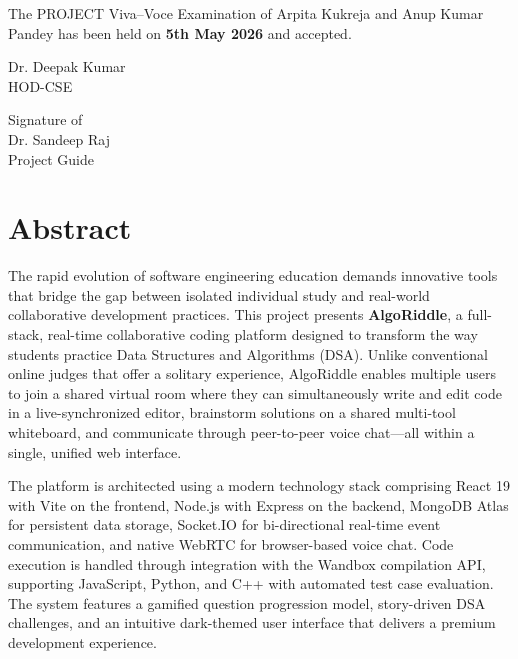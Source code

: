 \documentclass[12pt,a4paper,oneside]{report}
\begin{document}
\vspace{2cm}

The PROJECT Viva--Voce Examination of Arpita Kukreja and Anup Kumar Pandey has been held on \textbf{5th May 2026} and accepted.

\vspace{2cm}

\noindent
\begin{minipage}[t]{0.45\textwidth}
Dr. Deepak Kumar\\
HOD-CSE
\end{minipage}
\hfill
\begin{minipage}[t]{0.45\textwidth}
\raggedleft
Signature of\\
Dr. Sandeep Raj\\
Project Guide
\end{minipage}

\clearpage




\chapter*{Abstract}

The rapid evolution of software engineering education demands innovative tools that bridge the gap between isolated individual study and real-world collaborative development practices. This project presents \textbf{AlgoRiddle}, a full-stack, real-time collaborative coding platform designed to transform the way students practice Data Structures and Algorithms (DSA). Unlike conventional online judges that offer a solitary experience, AlgoRiddle enables multiple users to join a shared virtual room where they can simultaneously write and edit code in a live-synchronized editor, brainstorm solutions on a shared multi-tool whiteboard, and communicate through peer-to-peer voice chat---all within a single, unified web interface.

The platform is architected using a modern technology stack comprising React 19 with Vite on the frontend, Node.js with Express on the backend, MongoDB Atlas for persistent data storage, Socket.IO for bi-directional real-time event communication, and native WebRTC for browser-based voice chat. Code execution is handled through integration with the Wandbox compilation API, supporting JavaScript, Python, and C++ with automated test case evaluation. The system features a gamified question progression model, story-driven DSA challenges, and an intuitive dark-themed user interface that delivers a premium development experience.
\end{document}
